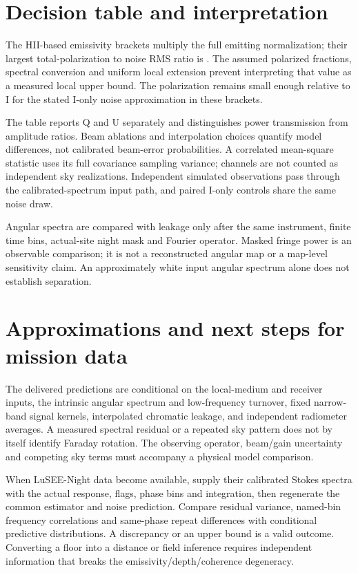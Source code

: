 \documentclass[10pt,letterpaper]{article}
\begin{document}


\clearpage
\section{Decision table and interpretation}





The HII-based emissivity brackets multiply the full emitting normalization;
their largest total-polarization to noise RMS ratio is
\MaxEmissivityTotalNoise. The assumed polarized fractions, spectral
conversion and uniform local extension prevent interpreting that value as
a measured local upper bound. The polarization remains small enough relative
to I for the stated I-only noise approximation in these brackets.

The table reports Q and U separately and distinguishes power transmission
from amplitude ratios. Beam ablations and interpolation choices quantify
model differences, not calibrated beam-error probabilities. A correlated
mean-square statistic uses its full covariance sampling variance;
channels are not counted as independent sky realizations. Independent
simulated observations pass through the calibrated-spectrum input path,
and paired I-only controls share the same noise draw.

Angular spectra are compared with leakage only after the same instrument,
finite time bins, actual-site night mask and Fourier operator. Masked
fringe power is an observable comparison; it is not a reconstructed angular
map or a map-level sensitivity claim. An approximately white input angular
spectrum alone does not establish separation.

\section{Approximations and next steps for mission data}

The delivered predictions are conditional on the local-medium and receiver
inputs, the intrinsic angular spectrum and low-frequency turnover, fixed
narrow-band signal kernels, interpolated chromatic leakage, and independent
radiometer averages. A measured spectral residual or a repeated sky pattern
does not by itself identify Faraday rotation. The observing operator,
beam/gain uncertainty and competing sky terms must accompany a physical
model comparison.

When LuSEE-Night data become available, supply their calibrated Stokes
spectra with the actual response, flags, phase bins and integration, then
regenerate the common estimator and noise prediction. Compare residual
variance, named-bin frequency correlations and same-phase repeat differences
with conditional predictive distributions. A discrepancy or an upper bound
is a valid outcome. Converting a floor into a distance or field inference
requires independent information that breaks the emissivity/depth/coherence
degeneracy.
\end{document}
